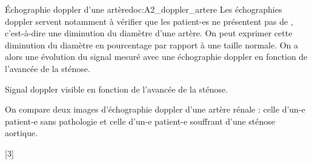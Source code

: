 \begin{doc}{Échographie doppler d'une artère}{doc:A2_doppler_artere}
  Les échographies doppler servent notamment à vérifier que les patient-es ne présentent pas de , c'est-à-dire une diminution du diamètre d'une artère.
  On peut exprimer cette diminution du diamètre en pourcentage par rapport à une taille normale.
  On a alors une évolution du signal mesuré avec une échographie doppler en fonction de l'avancée de la sténose.
  \begin{center}
    
    Signal doppler visible en fonction de l'avancée de la sténose.
  \end{center}

  On compare deux images d'échographie doppler d'une artère rénale : celle d'un-e patient-e sans pathologie et celle d'un-e patient-e souffrant d'une sténose aortique.
  
  \begin{center}
    
  \end{center}
\end{doc}


[3]
